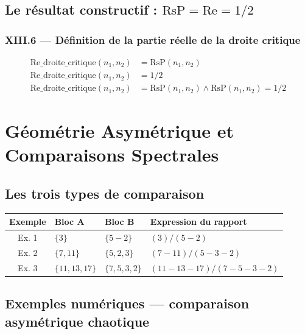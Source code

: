 \documentclass[11pt,a4paper]{article}
\begin{document}
\subsection{Le résultat constructif : $\text{RsP} = \text{Re} = 1/2$}
\label{hol:re_droite_critique}

\subsubsection*{XIII.6 --- Définition de la partie réelle de la droite critique}
\begin{align}
\text{Re\_droite\_critique}(n_1, n_2) &= \text{RsP}(n_1, n_2) \\
\text{Re\_droite\_critique}(n_1, n_2) &= 1/2 \\
\text{Re\_droite\_critique}(n_1, n_2) &= \text{RsP}(n_1, n_2) \wedge \text{RsP}(n_1, n_2) = 1/2
\end{align}

\section{Géométrie Asymétrique et Comparaisons Spectrales}

\subsection{Les trois types de comparaison}
\label{hol:rsp_asym_ordonnee}

\begin{longtable}{clll}
\toprule
\textbf{Exemple} & \textbf{Bloc A} & \textbf{Bloc B} & \textbf{Expression du rapport} \\
\midrule
Ex. 1 & $\{3\}$          & $\{5-2\}$      & $(3)/(5-2)$ \\
Ex. 2 & $\{7, 11\}$      & $\{5, 2, 3\}$  & $(7-11)/(5-3-2)$ \\
Ex. 3 & $\{11, 13, 17\}$ & $\{7, 5, 3, 2\}$ & $(11-13-17)/(7-5-3-2)$ \\
\bottomrule
\end{longtable}

\subsection{Exemples numériques --- comparaison asymétrique chaotique}
\label{hol:rsp_asym_chaotique}
\end{document}
